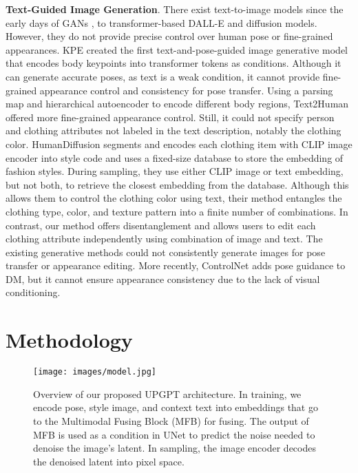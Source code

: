 \documentclass[10pt,twocolumn,letterpaper]{article}
\begin{document}
\textbf{Text-Guided Image Generation}. 
There exist text-to-image models since the early days of GANs \cite{stackgan, attngan, dmgan}, to transformer\cite{transformer}-based DALL-E\cite{dalle} and diffusion models\cite{glide,dalle2,ldm, imagen}. However, they do not provide precise control over human pose or fine-grained appearances. KPE\cite{kpe} created the first text-and-pose-guided image generative model that encodes body keypoints into transformer tokens as conditions. Although it can generate accurate poses, as text is a weak condition, it cannot provide fine-grained appearance control and consistency for pose transfer. Using a parsing map and hierarchical autoencoder to encode different body regions, Text2Human\cite{text2human} offered more fine-grained appearance control. Still, it could not specify person and clothing attributes not labeled in the text description, notably the clothing color. HumanDiffusion\cite{human_diffusion} segments and encodes each clothing item with CLIP image encoder into style code and uses a fixed-size database to store the embedding of fashion styles. During sampling, they use either CLIP image or text embedding, but not both, to retrieve the closest embedding from the database. Although this allows them to control the clothing color using text, their method entangles the clothing type, color, and texture pattern into a finite number of combinations. In contrast, our method offers disentanglement and allows users to edit each clothing attribute independently using combination of image and text. The existing generative methods could not consistently generate images for pose transfer or appearance editing. More recently, ControlNet \cite{controlnet} adds pose guidance to DM, but it cannot ensure appearance consistency due to the lack of visual conditioning.
\vspace{-4mm}
\section{Methodology}
\begin{figure*}[!htb]
    \begin{center}
        \texttt{[image: images/model.jpg]}
    \end{center}
    \caption{Overview of our proposed UPGPT architecture. In training, we encode pose, style image, and context text into embeddings that go to the Multimodal Fusing Block (MFB) for fusing. The output of MFB is used as a condition in UNet to predict the noise needed to denoise the image's latent. In sampling, the image encoder decodes the denoised latent  into pixel space.}
    \label{fig:model_1}
\end{figure*}
\end{document}
